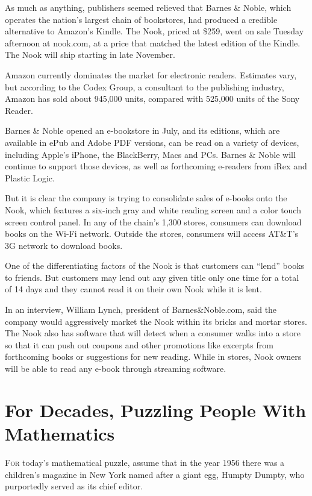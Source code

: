 ﻿\documentclass[12pt]{article}
\begin{document}
As much as anything, publishers seemed relieved that Barnes \& Noble, which operates the nation's
largest chain of bookstores, had produced a credible alternative to Amazon's Kindle. The Nook,
priced at \$259, went on sale Tuesday afternoon at nook.com, at a price that matched the latest
edition of the Kindle. The Nook will ship starting in late November.

Amazon currently dominates the market for electronic readers. Estimates vary, but according to the
Codex Group, a consultant to the publishing industry, Amazon has sold about 945,000 units, compared
with 525,000 units of the Sony Reader.

Barnes \& Noble opened an e-bookstore in July, and its editions, which are available in ePub and
Adobe PDF versions, can be read on a variety of devices, including Apple's iPhone, the BlackBerry,
Macs and PCs. Barnes \& Noble will continue to support those devices, as well as forthcoming
e-readers from iRex and Plastic Logic.

But it is clear the company is trying to consolidate sales of e-books onto the Nook, which features
a six-inch gray and white reading screen and a color touch screen control panel. In any of the
chain's 1,300 stores, consumers can download books on the Wi-Fi network. Outside the stores,
consumers will access AT\&T's 3G network to download books.

One of the differentiating factors of the Nook is that customers can ``lend'' books to friends. But
customers may lend out any given title only one time for a total of 14 days and they cannot read it
on their own Nook while it is lent.

In an interview, William Lynch, president of Barnes\&Noble.com, said the company would aggressively
market the Nook within its bricks and mortar stores. The Nook also has software that will detect
when a consumer walks into a store so that it can push out coupons and other promotions like
excerpts from forthcoming books or suggestions for new reading. While in stores, Nook owners will be
able to read any e-book through streaming software.

\section{For Decades, Puzzling People With Mathematics}

\lettrine{F}{or} today's mathematical puzzle, assume that in the year 1956
there was a children's magazine in New York named after a giant egg, Humpty Dumpty, who purportedly
served as its chief editor.
\end{document}
